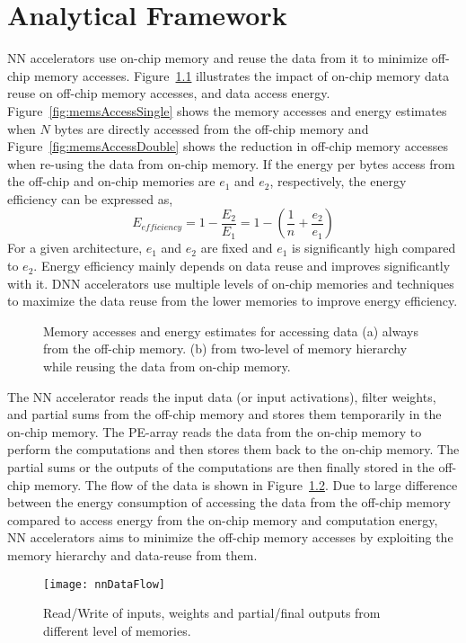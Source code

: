 \graphicspath{{./Ch2-AnalyticalFw/images/}}

\chapter{Analytical Framework} \label{chap:analyticalFw}
NN accelerators use on-chip memory and reuse the data from it to minimize off-chip memory accesses. Figure~\ref{fig:memsAccess} illustrates the impact of on-chip memory data reuse on off-chip memory accesses, and data access energy. Figure~\ref{fig:memsAccessSingle} shows the memory accesses and energy estimates when $N$ bytes are directly accessed from the off-chip memory and Figure~\ref{fig:memsAccessDouble} shows the reduction in off-chip memory accesses when re-using the data from on-chip memory. If the energy per bytes access from the off-chip and on-chip memories are $e_{1}$ and $e_{2}$, respectively, the energy efficiency can be expressed as, 
\begin{equation}\label{e_efficiency}
	E_{efficiency}=1-\frac{E_2}{E_1}=1-(\frac{1}{n}+\frac{e_{2}}{e_{1}})
\end{equation}
For a given architecture, $e_{1}$ and $e_{2}$ are fixed and $e_1$ is significantly high compared to $e_2$. Energy efficiency mainly depends on data reuse and improves significantly with it. DNN accelerators use multiple levels of on-chip memories and techniques to maximize the data reuse from the lower memories to improve energy efficiency. 
\begin{figure}[!h]
	\centering
	\captionsetup{font=sf}
	\hfil	
	\hfil	
	\caption{Memory accesses and energy estimates for accessing data (a) always from the off-chip memory. (b) from two-level of memory hierarchy while reusing the data from on-chip memory.}
	\label{fig:memsAccess}
\end{figure}

The NN accelerator reads the input data (or input activations), filter weights, and partial sums from the off-chip memory and stores them temporarily in the on-chip memory. The PE-array reads the data from the on-chip memory to perform the computations and then stores them back to the on-chip memory. The partial sums or the outputs of the computations are then finally stored in the off-chip memory. The flow of the data is shown in Figure~\ref{fig:nnDataFlow}. Due to large difference between the energy consumption of accessing the data from the off-chip memory compared to access energy from the on-chip memory and computation energy, NN accelerators aims to minimize the off-chip memory accesses by exploiting the memory hierarchy and data-reuse from them.
\begin{figure}[!htb]
	\centering
	\captionsetup{font=sf}	
	\texttt{[image: nnDataFlow]}
	\caption{Read/Write of inputs, weights and partial/final outputs from different level of memories.}
	\label{fig:nnDataFlow}
\end{figure}

